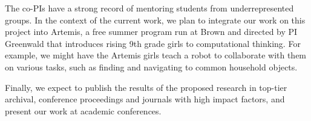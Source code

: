

The co-PIs have a strong record of mentoring students from
underrepresented groups.  In the context of the current work, we plan
to integrate our work on this project into Artemis, a free summer
program run at Brown and directed by PI Greenwald that introduces
rising 9th grade girls to computational thinking.  For example, we
might have the Artemis girls teach a robot to collaborate with them on
various tasks, such as finding and navigating to common household
objects.


Finally, we expect to publish the results of the proposed research in
top-tier archival, conference proceedings and journals with high
impact factors, and present our work at academic conferences.


